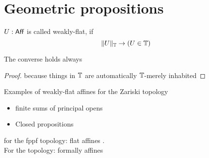 
\section{Geometric propositions}
\begin{definition}
	$U : \mathsf{Aff}$ is called weakly-flat, if 
	\[\|U\|_{\mathbb{T}} \to (U \in \mathbb{T})\]	
\end{definition}
\begin{lemma}{\label{lemma:geometricEquiv}}
	The converse holds always
\end{lemma}
\begin{proof}
	because things in $\mathbb{T}$ are automatically $\mathbb{T}$-merely inhabited
\end{proof}
\begin{example}
	Examples of weakly-flat affines for the Zariski topology
		\begin{itemize}
		\item finite sums of principal opens
		\item Closed propositions
	\end{itemize}
	for the fppf topology: flat affines . \\
	For the \etale topology: formally \etale affines
\end{example}

